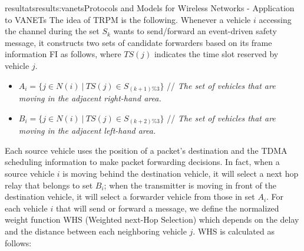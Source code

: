 \documentclass{ra2016}
\begin{document}
\begin{module}{resultats}{results:vanets}{Protocols and Models for Wireless Networks - Application to VANETs}
The idea of TRPM is the following. Whenever a vehicle $i$ accessing the channel during the set $S_k$ wants to send/forward an 
event-driven safety message, it constructs two sets of candidate forwarders based on its frame information FI as 
follows, where $TS(j)$ indicates the time slot reserved by vehicle $j$.

\begin{itemize}
	\item $A_i=\{j\in N(i)~|~TS(j)\in S_{(k+1)\%3}\}$ // \textit{The set of vehicles that are moving in the adjacent right-hand 
	area.}
	\item $B_i=\{j\in N(i)~|~TS(j)\in S_{(k+2)\%3}\}$ // \textit{The set of vehicles that are moving in the adjacent 
	left-hand area.}
\end{itemize}

Each source vehicle uses the position of a packet's destination and the TDMA scheduling information to make packet forwarding 
decisions. In fact, when a source vehicle $i$ is moving behind the destination vehicle, it will select a next hop relay that 
belongs to set $B_i$; when the transmitter is moving in front of the destination vehicle, it will select a forwarder vehicle 
from those in  set $A_i$. %
For each vehicle $i$ that will send or forward a message, we define the normalized weight function WHS (Weighted next-Hop 
Selection) which depends on the delay and the distance between each neighboring vehicle $j$. WHS is calculated as follows:


\end{module}
\end{document}
